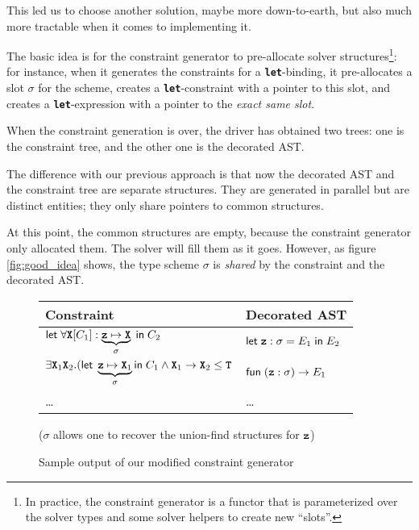 \documentclass[10pt,a4paper,twoside,titlepage,twocolumn]{article}
\newcommand{\code}[1]{\textbf{\texttt{#1}}}
\begin{document}
This led us to choose another solution, maybe more down-to-earth, but also much
more tractable when it comes to implementing it.

The basic idea is for the constraint generator to pre-allocate solver
structures\footnote{In practice, the constraint generator is a functor that is
parameterized over the solver types and some solver helpers to create new
``slots''.}: for instance, when it generates the constraints for a
\code{let}-binding, it pre-allocates a slot $\sigma$ for the scheme, creates a
\code{let}-constraint with a pointer to this slot, and creates a
\code{let}-expression with a pointer to the \emph{exact same slot}.

When the constraint generation is over, the driver has obtained two trees: one
is the constraint tree, and the other one is the decorated AST.

The difference with our previous approach is that now the decorated AST
and the constraint tree are separate structures. They are generated in parallel
but are distinct entities; they only share pointers to common structures.

At this point, the common structures are empty, because the constraint generator
only allocated them. The solver will fill them as it goes. However, as figure
\vref{fig:good_idea} shows, the type scheme $\sigma$ is \emph{shared} by the
constraint and the decorated AST.

\begin{figure}[h!]
  \small
    \begin{tabular}{l|l}
      \textbf{Constraint} & \textbf{Decorated AST} \\
      \hline


      $\cxlet{
          \forall\tvar[C_1]: \underbrace{\evar\mapsto\tvar}_{\sigma}
        }{C_2}$ &
        
      $\cxlet {\evar:\ts = E_1} {E_2}$ \\

      \hline


      $\exists\tvar_1\tvar_2.(
        \kwd{let}\;\underbrace{\evar\mapsto\tvar_1}_\sigma
        \kwd{in}\;{C_1}
        \wedge
        \tvar_1\arw\tvar_2\subtype\ttyp$ &

      $\kwd{fun}\;(\evar: \sigma) \to E_1$ \\

      \hline

      \dots & \dots

    \end{tabular}
    (\centering $\sigma$ allows one to recover the union-find structures for $\evar$)
  \caption{Sample output of our modified constraint generator}
  \label{fig:good_idea}
\end{figure}
\end{document}
